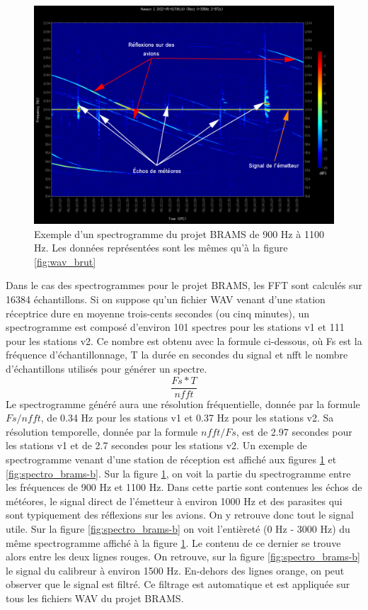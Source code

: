 \documentclass[11pt]{article}
\begin{document}
\begin{figure}[h]
    \begin{center}
        \includegraphics[scale=0.29]{spectrogramme_legend.png}
        \caption{Exemple d'un spectrogramme du projet BRAMS de 900 Hz à 1100 Hz. Les données représentées sont les mêmes qu'à la figure \ref{fig:wav_brut}}
        \label{fig:spectro_brams-a}
    \end{center}
\end{figure}

Dans le cas des spectrogrammes pour le projet BRAMS, les FFT sont calculés sur 16384 échantillons.
Si on suppose qu'un fichier WAV venant d'une station réceptrice dure en moyenne trois-cents secondes (ou cinq minutes), un spectrogramme est composé d'environ 101 spectres pour les stations v1 et 111 pour les stations v2.
Ce nombre est obtenu avec la formule ci-dessous, où Fs est la fréquence d'échantillonnage, T la durée en secondes du signal et nfft le nombre d'échantillons utilisés pour générer un spectre.
\[\frac{Fs * T}{nfft}\]
Le spectrogramme généré aura une résolution fréquentielle, donnée par la formule \(Fs / nfft\), de 0.34 Hz pour les stations v1 et 0.37 Hz pour les stations v2.
Sa résolution temporelle, donnée par la formule \(nfft / Fs\), est de 2.97 secondes pour les stations v1 et de 2.7 secondes pour les stations v2.
Un exemple de spectrogramme venant d'une station de réception est affiché aux figures \ref{fig:spectro_brams-a} et \ref{fig:spectro_brams-b}.
Sur la figure \ref{fig:spectro_brams-a}, on voit la partie du spectrogramme entre les fréquences de 900 Hz et 1100 Hz.
Dans cette partie sont contenues les échos de météores, le signal direct de l'émetteur à environ 1000 Hz et des parasites qui sont typiquement des réflexions sur les avions.
On y retrouve donc tout le signal utile.
Sur la figure \ref{fig:spectro_brams-b} on voit l'entièreté (0 Hz - 3000 Hz) du même spectrogramme affiché à la figure \ref{fig:spectro_brams-a}.
Le contenu de ce dernier se trouve alors entre les deux lignes rouges.
On retrouve, sur la figure \ref{fig:spectro_brams-b} le signal du calibreur à environ 1500 Hz.
En-dehors des lignes orange, on peut observer que le signal est filtré.
Ce filtrage est automatique et est appliquée sur tous les fichiers WAV du projet BRAMS.
\end{document}
